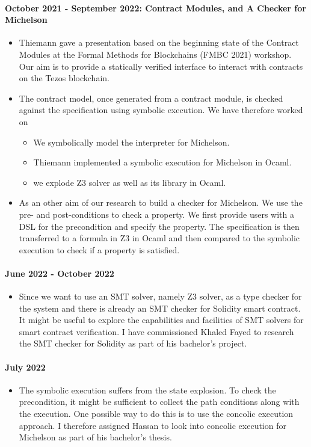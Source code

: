 \documentclass[a4paper,11pt]{article}
\begin{document}
\paragraph{October 2021 - September 2022: Contract Modules, and A Checker for Michelson}
\begin{itemize}
\item Thiemann gave a presentation based on the beginning state of the Contract Modules at the Formal Methods for Blockchains (FMBC 2021) workshop.  Our aim is to provide a statically verified interface to interact with contracts on the Tezos blockchain.
\item The contract model, once generated from a contract module, is checked against the specification using symbolic execution. We have therefore worked on

\begin{itemize}
\item We symbolically model the interpreter for Michelson.
\item Thiemann implemented a symbolic execution for Michelson in Ocaml.
\item we explode Z3 solver as well as its library in Ocaml.
\end{itemize}

\item  As an other aim of our research to build a checker for Michelson. We use the pre- and post-conditions to check a property. We first provide users with a DSL for the precondition and specify the property. The specification is then transferred to a formula in Z3 in Ocaml and then compared to the symbolic execution to check if a property is satisfied.
\end{itemize}


\paragraph{June 2022 - October 2022} 
\begin{itemize}
\item Since we want to use an SMT solver, namely Z3  solver, as a type checker for the system and there is already an SMT checker for Solidity smart contract. It might be useful to explore the capabilities and facilities of SMT solvers for smart contract verification. I have commissioned Khaled Fayed to research the SMT checker for Solidity as part of his bachelor's project.
\end{itemize}

\paragraph{July 2022}
\begin{itemize}
\item The symbolic execution suffers from the state explosion. To check the precondition, it might be sufficient to collect the path conditions along with the execution. One possible way to do this is to use the concolic execution approach. I therefore assigned Hassan to look into concolic execution for Michelson as part of his bachelor's thesis.
\end{itemize}
\end{document}
